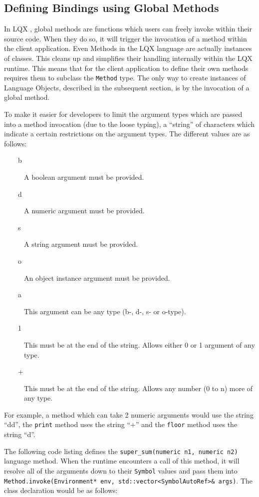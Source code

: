 \documentclass[]{article}
\newcommand{\ModLang}{LQX }
\begin{document}
  \subsection{Defining Bindings using Global Methods}
  
  In \ModLang, global methods are functions which users can freely invoke within their source
  code. When they do so, it will trigger the invocation of a method within the client application.
  Even Methods in the \ModLang language are actually instances of classes. This cleans up and
  simplifies their handling internally within the \ModLang runtime. This means that for the
  client application to define their own methods requires them to subclass the {\tt Method} type.
  The only way to create instances of Language Objects, described in the subsequent section, is
  by the invocation of a global method.
  
  To make it easier for developers to limit the argument types which are passed into a method
  invocation (due to the loose typing), a ``string'' of characters which indicate a certain
  restrictions on the argument types. The different values are as follows:
  
  \begin{description}
    \item[\ \ \ \ b] A boolean argument must be provided.
    \item[\ \ \ \ d] A numeric argument must be provided.
    \item[\ \ \ \ s] A string argument must be provided.
    \item[\ \ \ \ o] An object instance argument must be provided.
    \item[\ \ \ \ a] This argument can be any type (b-, d-, s- or o-type).
    \item[\ \ \ \ 1] This must be at the end of the string. Allows either 0 or 1 argument of any type.
    \item[\ \ \ \ +] This must be at the end of the string. Allows any number (0 to n) more of any type.
  \end{description} 
  
  For example, a method which can take 2 numeric arguments would use the string ``dd'', the
  {\tt print} method uses the string ``+'' and the {\tt floor} method uses the string ``d''.
  
  The following code listing defines the {\tt super\_sum(numeric n1, numeric n2)} language method.
  When the runtime encounters a call of this method, it will resolve all of the arguments down
  to their {\tt Symbol} values and pass them into {\tt Method.invoke(Environment* env,
  std::vector<SymbolAutoRef>\& args)}. The class declaration would be as follows:
  
\end{document}
